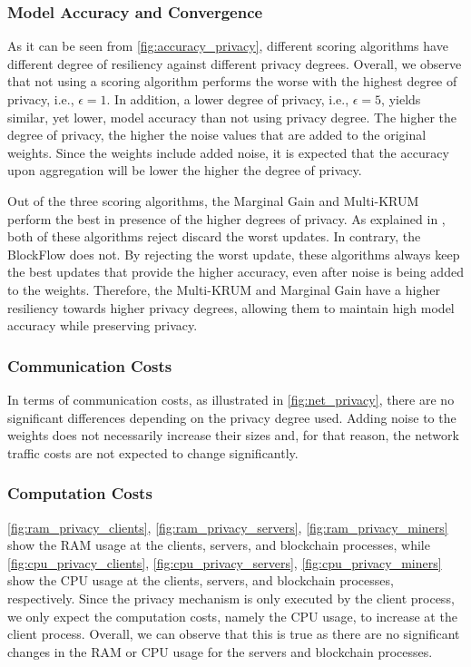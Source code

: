 \subsubsection{Model Accuracy and Convergence}

As it can be seen from \autoref{fig:accuracy_privacy}, different scoring algorithms have different degree of resiliency against different privacy degrees. Overall, we observe that not using a scoring algorithm performs the worse with the highest degree of privacy, i.e., $\epsilon = 1$. In addition, a lower degree of privacy, i.e., $\epsilon = 5$, yields similar, yet lower, model accuracy than not using privacy degree. The higher the degree of privacy, the higher the noise values that are added to the original weights. Since the weights include added noise, it is expected that the accuracy upon aggregation will be lower the higher the degree of privacy.

Out of the three scoring algorithms, the Marginal Gain and Multi-KRUM perform the best in presence of the higher degrees of privacy. As explained in , both of these algorithms reject discard the worst updates. In contrary, the BlockFlow does not. By rejecting the worst update, these algorithms always keep the best updates that provide the higher accuracy, even after noise is being added to the weights. Therefore, the Multi-KRUM and Marginal Gain have a higher resiliency towards higher privacy degrees, allowing them to maintain high model accuracy while preserving privacy.

\subsubsection{Communication Costs}

In terms of communication costs, as illustrated in \autoref{fig:net_privacy}, there are no significant differences depending on the privacy degree used. Adding noise to the weights does not necessarily increase their sizes and, for that reason, the network traffic costs are not expected to change significantly.

\subsubsection{Computation Costs}

\autoref{fig:ram_privacy_clients}, \autoref{fig:ram_privacy_servers}, \autoref{fig:ram_privacy_miners} show the RAM usage at the clients, servers, and blockchain processes, while \autoref{fig:cpu_privacy_clients}, \autoref{fig:cpu_privacy_servers}, \autoref{fig:cpu_privacy_miners} show the CPU usage at the clients, servers, and blockchain processes, respectively. Since the privacy mechanism is only executed by the client process, we only expect the computation costs, namely the CPU usage, to increase at the client process. Overall, we can observe that this is true as there are no significant changes in the RAM or CPU usage for the servers and blockchain processes.

